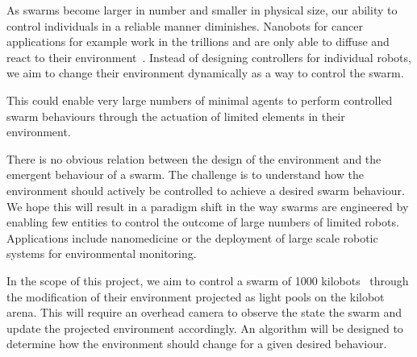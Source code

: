 \documentclass{article}
\begin{document}
As swarms become larger in number and smaller in physical size, our ability to
control individuals in a reliable manner diminishes. Nanobots for cancer
applications for example work in the trillions and are only able to diffuse and
react to their environment~\cite{nano}. Instead of designing controllers for
individual robots, we aim to change their environment dynamically as a way to
control the swarm.

This could enable very large numbers of minimal agents to perform controlled
swarm behaviours through the actuation of limited elements in their
environment.

There is no obvious relation between the design of the environment and the
emergent behaviour of a swarm. The challenge is to understand how the
environment should actively be controlled to achieve a desired swarm behaviour.
We hope this will result in a paradigm shift in the way swarms are engineered
by enabling few entities to control the outcome of large numbers of limited
robots. Applications include nanomedicine or the deployment of large scale
robotic systems for environmental monitoring.

In the scope of this project, we aim to control a swarm of 1000
kilobots~\cite{swarm} through the modification of their environment projected
as light pools on the kilobot arena. This will require an overhead camera to
observe the state the swarm and update the projected environment accordingly.
An algorithm will be designed to determine how the environment should change
for a given desired behaviour.

 
\end{document}
